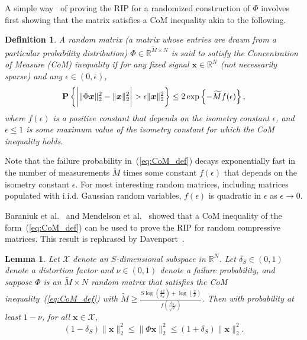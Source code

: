 \documentclass[11pt,draftcls,onecolumn]{IEEEtran}
\def\real    { \mathbb{R} }
\newtheorem{lemma}{Lemma}
\newtheorem{definition}{Definition}
\newcommand{\Prob}[1]{{\bf P}\left\{#1\right\}}
\def \km {{\widetilde{M}}}
\newcommand{\vc}[1]{\boldsymbol{#1}}
\def\real    { \mathbb{R} }
\begin{document}
A simple way~\cite{baraniuk2008simple,DeVoreL1IO} of proving the \ac{RIP} for a randomized construction of $\Phi$ involves first showing that the matrix satisfies a \ac{CoM} inequality akin to the following.
\begin{definition}
A random matrix (a matrix whose entries are drawn from a particular probability distribution) $\Phi \in \real^{\km \times N}$ is said to satisfy the
Concentration of Measure (CoM) inequality if for any fixed signal $\vc{x} \in \real^N$ (not necessarily sparse) and any $\epsilon \in (0,\overline{\epsilon})$,
\begin{equation}
\Prob{\bigg{|} \| \Phi \vc{x} \|_2^2 - \|\vc{x}\|_2^2 \bigg{|} > \epsilon \|\vc{x}\|_2^2 } \leq 2 \exp \left\{ -\km f(\epsilon)\right\},
\label{eq:CoM_def}
\end{equation}
where $f(\epsilon)$ is a positive constant that depends on the isometry constant $\epsilon$, and $\overline{\epsilon} \le 1$ is some maximum value of the isometry constant for which the CoM inequality holds.
\label{def:concgauss}
\end{definition}

Note that the failure probability in~(\ref{eq:CoM_def}) decays exponentially fast in the number of measurements $\km$ times some constant $f\left(\epsilon\right)$ that depends on the isometry constant $\epsilon$. For most interesting random matrices, including matrices populated with \ac{i.i.d.} Gaussian random variables, $f(\epsilon)$ is quadratic in $\epsilon$ as $\epsilon \to 0$.

Baraniuk et al.~\cite{baraniuk2008simple} and Mendelson et al.~\cite{mendelson2008uniform} showed that a \ac{CoM} inequality of the form~(\ref{eq:CoM_def}) can be used to prove the \ac{RIP} for random compressive matrices.
This result is rephrased by Davenport~\cite{davenport2010thesis}.
\begin{lemma} {\em \cite{davenport2010thesis}}
Let $\mathcal{X}$ denote an $S$-dimensional subspace in $\real^N$.
Let $\delta_S \in (0,1)$ denote a distortion factor and $\nu \in (0,1)$ denote a failure probability, and suppose $\Phi$ is an $\km \times N$ random matrix that satisfies the \ac{CoM} inequality~(\ref{eq:CoM_def}) with 
$\km \geq \frac{S\log(\frac{42}{\delta_S})+ \log(\frac{2}{\nu})}{f(\frac{\delta_S}{\sqrt{2}})}$.
Then with probability at least $1-\nu$, for all $\vc{x} \in \mathcal{X}$,
\begin{equation*}
(1-\delta_S) \|\vc{x}\|^2_2 \le \| \Phi \vc{x}\|^2_2 \le (1+\delta_S) \|\vc{x}\|^2_2.
\end{equation*}
\label{lem:RIP_based_CoM}
\end{lemma}
\end{document}
